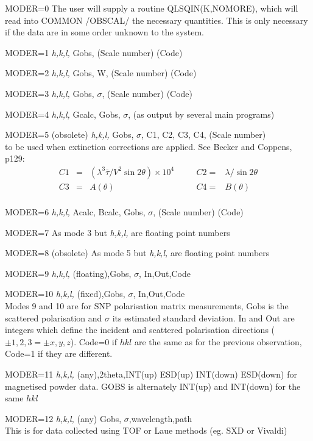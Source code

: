 \begin{list} {} {\setlength{\labelwidth}{ 3 cm}
  \setlength{\parsep}{-1ex}
  \setlength{\leftmargin}{\labelwidth}
 \addtolength{\leftmargin}{1.5cm}}
\item[MODER=0 \hfill] The user will supply a routine QLSQIN(K,NOMORE), which
                  will read into COMMON /OBSCAL/ the necessary
                  quantities.  This is only necessary if the data are
                  in some order unknown to the system.
\item[MODER=1 \hfill]  {\em h,k,l,} Gobs, (Scale number) (Code)
\item[MODER=2 \hfill]  {\em h,k,l,} Gobs, W, (Scale number) (Code)
\item[MODER=3 \hfill]  {\em h,k,l,} Gobs, $\sigma$, (Scale number) (Code)
\item[MODER=4 \hfill]  {\em h,k,l,} Gcalc, Gobs, $\sigma$, (as output by several 
main programs)
\item[MODER=5 (obsolete)] {\em h,k,l,} Gobs, $\sigma$, C1, C2, C3, C4, (Scale number)\\
to be used when extinction corrections are applied.
See Becker and Coppens,   p129:
\[\begin{array}{llllll}
C1 &= &(\lambda^3\overline\tau /V^2 \sin2\theta)\times 10^4&\quad
&C2 = &\lambda/\sin2\theta\\
C3 &= &A(\theta)&
&C4 = &B(\theta)\\[-2ex]
\end{array}\]
\item[MODER=6 \hfill]  {\em h,k,l,} Acalc, Bcalc, Gobs, $\sigma$, (Scale number) (Code)
\item[MODER=7 \hfill] As mode 3 but {\em h,k,l,} are floating point numbers
\item[MODER=8  (obsolete) ]As mode 5 but {\em h,k,l,} are floating point numbers
\item[MODER=9 \hfill] {\em h,k,l,} (floating),Gobs, $\sigma$, In,Out,Code
\item[MODER=10 \hfill] {\em h,k,l,} (fixed),Gobs, $\sigma$, In,Out,Code\\
Modes 9 and 10 are for SNP polarisation matrix measurements, Gobs is the scattered
polarisation and $\sigma$ its estimated standard deviation. In and Out are integers which 
define the incident and scattered polarisation directions ($\pm 1,2,3=\pm x,y,z$). Code=0 if $hkl$ are the same as for the previous observation, Code=1 if they are different.
\item[MODER=11 \hfill]{\em h,k,l,} (any),2theta,INT(up) ESD(up) INT(down) ESD(down)  for 
magnetised powder data. GOBS is alternately INT(up) and INT(down) for the same $hkl$ 
\item[MODER=12 \hfill]{\em h,k,l,} (any) Gobs, $\sigma$,wavelength,path\\
This is for data collected using TOF or Laue methods (eg. SXD or Vivaldi)

\end{list}
